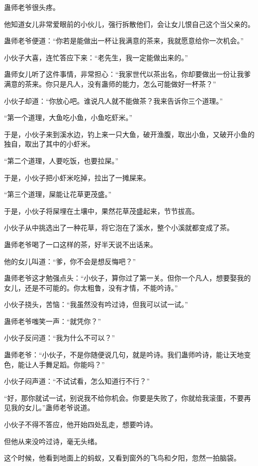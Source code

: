 \begin{this_body}
蛊师老爷很头疼。

他知道女儿非常爱眼前的小伙儿，强行拆散他们，会让女儿恨自己这个当父亲的。

蛊师老爷便道：“你若是能做出一杯让我满意的茶来，我就愿意给你一次机会。”

小伙子大喜，连忙答应下来：“老先生，我一定能做出来的。”

蛊师女儿听了这件事情，非常担心：“我家世代以茶出名，你却要做出一份让我爹满意的茶来。你只是凡人，没有蛊师的能力，怎么可能做好一杯茶？”

小伙子却道：“你放心吧。谁说凡人就不能做茶？我来告诉你三个道理。”

“第一个道理，大鱼吃小鱼，小鱼吃虾米。”

于是，小伙子来到溪水边，钓上来一只大鱼，破开渔腹，取出小鱼，又破开小鱼的独自，取出了其中的小虾米。

“第二个道理，人要吃饭，也要拉屎。”

于是，小伙子把小虾米吃掉，拉出了一摊屎来。

“第三个道理，屎能让花草更茂盛。”

于是，小伙子将屎埋在土壤中，果然花草茂盛起来，节节拔高。

小伙子从中挑选出了一种花草，将它泡在了溪水，整个小溪就都变成了茶。

蛊师老爷喝了一口这样的茶，好半天说不出话来。

他的女儿叫道：“爹，你不会是想反悔吧？”

蛊师老爷这才勉强点头：“小伙子，算你过了第一关。但你一个凡人，想要娶我的女儿，还是不可能的。你太粗鲁，没有才情，不能吟诗。”

小伙子挠头，苦恼：“我虽然没有吟过诗，但我可以试一试。”

蛊师老爷嗤笑一声：“就凭你？”

小伙子反问道：“我为什么不可以？”

蛊师老爷：“小伙子，不是你随便说几句，就是吟诗。我们蛊师吟诗，能让天地变色，能让人手舞足蹈。你能吗？”

小伙子闷声道：“不试试看，怎么知道行不行？”

“好，那你就试一试，别说我不给你机会。你要是失败了，你就给我滚蛋，不要再见我的女儿。”蛊师老爷说道。

小伙子不得不答应，他开始四处乱走，想要吟诗。

但他从来没吟过诗，毫无头绪。

这个时候，他看到地面上的蚂蚁，又看到窗外的飞鸟和夕阳，忽然一拍脑袋。


\end{this_body}
